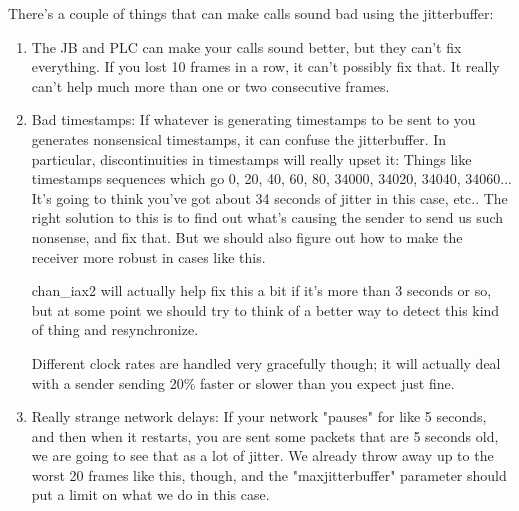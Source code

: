 There's a couple of things that can make calls sound bad using the jitterbuffer:

\begin{enumerate}
\item The JB and PLC can make your calls sound better, but they can't fix everything.  
If you lost 10 frames in a row, it can't possibly fix that.  It really can't help much 
more than one or two consecutive frames.

\item Bad timestamps:  If whatever is generating timestamps to be sent to you generates 
nonsensical timestamps, it can confuse the jitterbuffer.  In particular, discontinuities 
in timestamps will really upset it:  Things like timestamps sequences which go 0, 20, 40, 
60, 80,  34000, 34020, 34040, 34060...   It's going to think you've got about 34 seconds 
of jitter in this case, etc..
The right solution to this is to find out what's causing the sender to send us such nonsense, 
and fix that.  But we should also figure out how to make the receiver more robust in 
cases like this.

chan\_iax2 will actually help fix this a bit if it's more than 3 seconds or so, but at 
some point we should try to think of a better way to detect this kind of thing and 
resynchronize.

Different clock rates are handled very gracefully though; it will actually deal with a 
sender sending 20\% faster or slower than you expect just fine.

\item Really strange network delays:  If your network "pauses" for like 5 seconds, and then 
when it restarts, you are sent some packets that are 5 seconds old, we are going to see 
that as a lot of jitter.   We already throw away up to the worst 20 frames like this, 
though, and the "maxjitterbuffer" parameter should put a limit on what we do in this case.

\end{enumerate}
